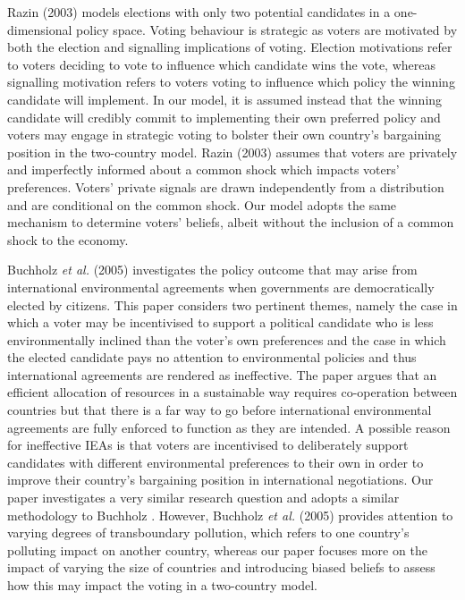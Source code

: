 \documentclass[11pt,preprint, authoryear]{elsarticle}
\numberwithin{equation}{section}
\numberwithin{figure}{section}
\numberwithin{table}{section}
\begin{document}
Razin (2003) models elections with only two potential candidates in a
one-dimensional policy space. Voting behaviour is strategic as voters
are motivated by both the election and signalling implications of
voting. Election motivations refer to voters deciding to vote to
influence which candidate wins the vote, whereas signalling motivation
refers to voters voting to influence which policy the winning candidate
will implement. In our model, it is assumed instead that the winning
candidate will credibly commit to implementing their own preferred
policy and voters may engage in strategic voting to bolster their own
country's bargaining position in the two-country model. Razin (2003)
assumes that voters are privately and imperfectly informed about a
common shock which impacts voters' preferences. Voters' private signals
are drawn independently from a distribution and are conditional on the
common shock. Our model adopts the same mechanism to determine voters'
beliefs, albeit without the inclusion of a common shock to the economy.

Buchholz \emph{et al.} (2005) investigates the policy outcome that may
arise from international environmental agreements when governments are
democratically elected by citizens. This paper considers two pertinent
themes, namely the case in which a voter may be incentivised to support
a political candidate who is less environmentally inclined than the
voter's own preferences and the case in which the elected candidate pays
no attention to environmental policies and thus international agreements
are rendered as ineffective. The paper argues that an efficient
allocation of resources in a sustainable way requires co-operation
between countries but that there is a far way to go before international
environmental agreements are fully enforced to function as they are
intended. A possible reason for ineffective IEAs is that voters are
incentivised to deliberately support candidates with different
environmental preferences to their own in order to improve their
country's bargaining position in international negotiations. Our paper
investigates a very similar research question and adopts a similar
methodology to Buchholz . However, Buchholz \emph{et al.} (2005)
provides attention to varying degrees of transboundary pollution, which
refers to one country's polluting impact on another country, whereas our
paper focuses more on the impact of varying the size of countries and
introducing biased beliefs to assess how this may impact the voting in a
two-country model.
\end{document}
